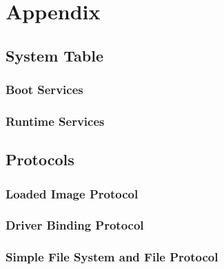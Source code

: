 
\chapter{Appendix}

\section{System Table}

\clearpage

\subsection{Boot Services}

\clearpage

\subsection{Runtime Services}

\clearpage

\section{Protocols}

\subsection{Loaded Image Protocol}


\clearpage

\subsection{Driver Binding Protocol}


\clearpage

\subsection{Simple File System and File Protocol}


